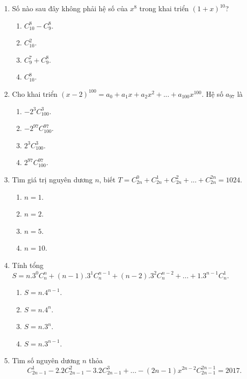 \begin{enumerate}[label=\textbf{Câu \arabic*.},align=left,left=0cm..0cm,itemindent=*]
	\item Số nào sau đây không phải hệ số của $x^8$ trong khai triển $(1+x)^{10}$?
	\begin{multicols}{4}\begin{enumerate}[label=\textbf{\Alph*.},align=left,left=1cm..0cm,itemindent=*]
		\item $C_{10}^8-C_9^8$. \item $C_{10}^2$. \item $C_9^7+C_9^8$. \item $C_{10}^8$.
	\end{enumerate}\end{multicols}
	\item Cho khai triển $(x-2)^{100}=a_0+a_1x+a_2x^2+...+a_{100}x^{100}$. Hệ số $a_{97}$ là
	\begin{multicols}{4}\begin{enumerate}[label=\textbf{\Alph*.},align=left,left=1cm..0cm,itemindent=*]
		\item $-2^3C_{100}^3$. \item $-2^{97}C_{100}^{97}$. \item $2^3C_{100}^3$. \item $2^{97}C_{100}^{97}$.
	\end{enumerate}\end{multicols}
	\item Tìm giá trị nguyên dương $n$, biết $T=C_{2n}^0+C_{2n}^1+C_{2n}^2+...+C_{2n}^{2n}=1024$.
	\begin{multicols}{4}\begin{enumerate}[label=\textbf{\Alph*.},align=left,left=1cm..0cm,itemindent=*]
		\item $n=1$. \item $n=2$. \item $n=5$. \item $n=10$.
	\end{enumerate}\end{multicols}
	\item Tính tổng $S=n.3^0C_n^n+(n-1).3^1C_n^{n-1}+(n-2).3^2C_n^{n-2}+...+1.3^{n-1}C_n^1$.
	\begin{enumerate}[label=\textbf{\Alph*.},align=left,left=1cm..0cm,itemindent=*]
		\item $S=n.4^{n-1}$. \item $S=n.4^n$. \item $S=n.3^n$. \item $S=n.3^{n-1}$.
	\end{enumerate}
	\item Tìm số nguyên dương $n$ thỏa $$C_{2n-1}^1-2.2C_{2n-1}^2-3.2C_{2n-1}^3+...-(2n-1)x^{2n-2}C_{2n-1}^{2n-1}=2017.$$

\end{enumerate}
